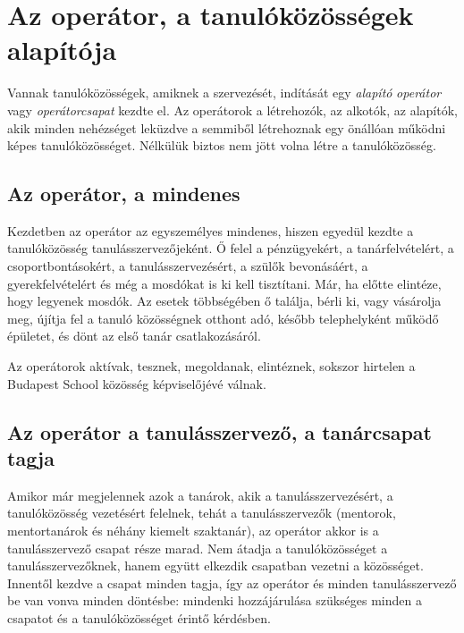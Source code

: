 \hypertarget{operator-a-tanulokozossegek-alapitoja}{%
\section{Az operátor, a tanulóközösségek
alapítója}\label{operator-a-tanulokozossegek-alapitoja}}

Vannak tanulóközösségek, amiknek a szervezését, indítását egy \emph{alapító}
\emph{operátor} vagy \emph{operátorcsapat} kezdte el. Az operátorok a
létrehozók, az alkotók, az alapítók, akik minden nehézséget leküzdve a
semmiből létrehoznak egy önállóan működni képes tanulóközösséget.
Nélkülük biztos nem jött volna létre a tanulóközösség.

\hypertarget{az-operator-a-mindenes}{%
\subsection{Az operátor, a mindenes}\label{az-operator-a-mindenes}}

Kezdetben az operátor az egyszemélyes mindenes, hiszen egyedül kezdte a
tanulóközösség tanulásszervezőjeként. Ő felel a pénzügyekért, a
tanárfelvételért, a csoportbontásokért, a tanulásszervezésért, a szülők
bevonásáért, a gyerekfelvételért és még a mosdókat is ki kell
tisztítani. Már, ha előtte elintéze, hogy legyenek mosdók. Az esetek
többségében ő találja, bérli ki, vagy vásárolja meg, újítja fel a tanuló
közösségnek otthont adó, később telephelyként működő épületet, és dönt az
első tanár csatlakozásáról.

Az operátorok aktívak, tesznek, megoldanak, elintéznek, sokszor hirtelen
a Budapest School közösség képviselőjévé válnak.

\hypertarget{az-operator-a-tanulasszervezo-a-tanarcsapat-tagja}{%
\subsection{Az operátor a tanulásszervező, a tanárcsapat
tagja}\label{az-operator-a-tanulasszervezo-a-tanarcsapat-tagja}}

Amikor már megjelennek azok a tanárok, akik a tanulásszervezésért, a
tanulóközösség vezetésért felelnek, tehát a tanulásszervezők (mentorok,
mentortanárok és néhány kiemelt szaktanár), az operátor akkor is a
tanulásszervező csapat része marad. Nem átadja a tanulóközösséget a
tanulásszervezőknek, hanem együtt elkezdik csapatban vezetni a közösséget.
Innentől kezdve a csapat minden tagja, így az operátor és minden
tanulásszervező be van vonva minden döntésbe: mindenki hozzájárulása
szükséges minden a csapatot és a tanulóközösséget érintő kérdésben.

